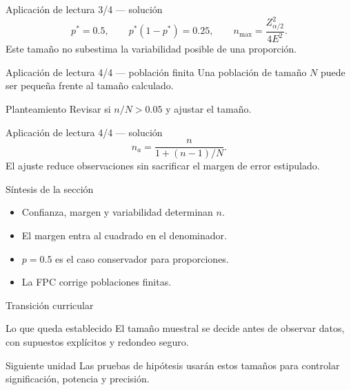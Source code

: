 \documentclass[10pt,aspectratio=169]{beamer}
\begin{document}
\begin{frame}{Aplicación de lectura 3/4 --- solución}
  \footnotesize
  \[
    p^*=0.5,\qquad p^*(1-p^*)=0.25,
    \qquad n_{\max}=\frac{Z_{\alpha/2}^2}{4E^2}.
  \]
  Este tamaño no subestima la variabilidad posible de una proporción.
\end{frame}

\begin{frame}{Aplicación de lectura 4/4 --- población finita}
  \footnotesize
  Una población de tamaño $N$ puede ser pequeña frente al tamaño calculado.
  \begin{block}{Planteamiento}
    Revisar si $n/N>0.05$ y ajustar el tamaño.
  \end{block}
\end{frame}

\begin{frame}{Aplicación de lectura 4/4 --- solución}
  \footnotesize
  \[
    n_a=\frac{n}{1+(n-1)/N}.
  \]
  El ajuste reduce observaciones sin sacrificar el margen de error estipulado.
\end{frame}

\begin{frame}{Síntesis de la sección}
  \footnotesize
  \begin{itemize}\itemsep=0.12cm
    \item Confianza, margen y variabilidad determinan $n$.
    \item El margen entra al cuadrado en el denominador.
    \item $p=0.5$ es el caso conservador para proporciones.
    \item La FPC corrige poblaciones finitas.
  \end{itemize}
\end{frame}

\begin{frame}{Transición curricular}
  \footnotesize
  \begin{block}{Lo que queda establecido}
    El tamaño muestral se decide antes de observar datos, con supuestos
    explícitos y redondeo seguro.
  \end{block}
  \begin{alertblock}{Siguiente unidad}
    Las pruebas de hipótesis usarán estos tamaños para controlar significación,
    potencia y precisión.
  \end{alertblock}
\end{frame}
\end{document}
